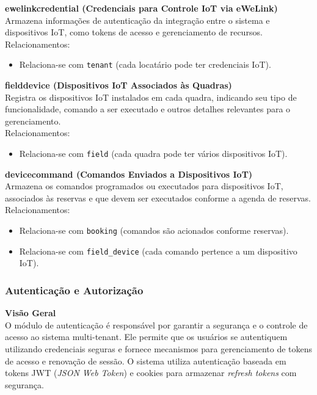 \textbf{ewelink\textunderscore credential (Credenciais para Controle IoT via eWeLink)}\\
Armazena informações de autenticação da integração entre o sistema e dispositivos IoT, como tokens de acesso e gerenciamento de recursos. \\
Relacionamentos: 

\begin{itemize} 
	\item Relaciona-se com \texttt{tenant} (cada locatário pode ter credenciais IoT). 
\end{itemize}


\textbf{field\textunderscore device (Dispositivos IoT Associados às Quadras)}\\
Registra os dispositivos IoT instalados em cada quadra, indicando seu tipo de funcionalidade, comando a ser executado e outros detalhes relevantes para o gerenciamento. \\
Relacionamentos: 

\begin{itemize} 
	\item Relaciona-se com \texttt{field} (cada quadra pode ter vários dispositivos IoT). 
\end{itemize}


\textbf{device\textunderscore command (Comandos Enviados a Dispositivos IoT)}\\
Armazena os comandos programados ou executados para dispositivos IoT, associados às reservas e que devem ser executados conforme a agenda de reservas. \\
Relacionamentos: 

\begin{itemize} 
	\item Relaciona-se com \texttt{booking} (comandos são acionados conforme reservas). 
	\item Relaciona-se com \texttt{field\_device} (cada comando pertence a um dispositivo IoT). 
\end{itemize}

\subsubsection{Autenticação e Autorização}\label{subsubsec:autenticacao_autorizacao}

\textbf{Visão Geral}\\
O módulo de autenticação é responsável por garantir a segurança e o controle de acesso ao sistema multi-tenant. Ele permite que os usuários se autentiquem utilizando credenciais seguras e fornece mecanismos para gerenciamento de tokens de acesso e renovação de sessão. O sistema utiliza autenticação baseada em tokens JWT (\textit{JSON Web Token}) e cookies para armazenar \textit{refresh tokens} com segurança.

